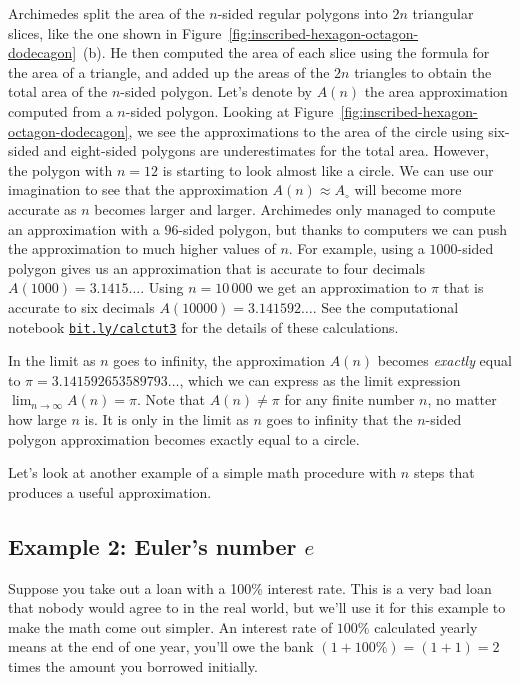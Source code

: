 		Archimedes split the area of the $n$-sided regular polygons into $2n$ triangular slices,
		like the one shown in Figure~\ref{fig:inscribed-hexagon-octagon-dodecagon}~(b).
		He then computed the area of each slice using the formula for the area of a triangle,
		and added up the areas of the $2n$ triangles
		to obtain the total area of the $n$-sided polygon.
		Let's denote by $A(n)$ the area approximation
		computed from a $n$-sided polygon.
		Looking at Figure~\ref{fig:inscribed-hexagon-octagon-dodecagon},
		we see the approximations to the area of the circle
		using six-sided and eight-sided polygons are underestimates for the total area.
		However,
		the polygon with $n=12$ is starting to look almost like a circle.
		We can use our imagination to see that the approximation $A(n) \approx A_{\circ}$
		will become more accurate as $n$ becomes larger and larger.
		Archimedes only managed to compute an approximation with a $96$-sided polygon,
		but thanks to computers we can push the approximation to much higher values of $n$.
		For example,
		using a $1000$-sided polygon gives us
		an approximation that is accurate to four decimals $A(1000) = 3.1415\ldots$.
		Using $n=10\,000$ we get an approximation to $\pi$
		that is accurate to six decimals $A(10000) = 3.141592\ldots$.
		See the computational notebook \href{https://bit.ly/calctut3}{\tt{bit.ly/calctut3}}
		for the details of these calculations.

		In the limit as $n$ goes to infinity,
		the approximation $A(n)$
		becomes \emph{exactly} equal to $\pi = 3.141592653589793\ldots$,
		which we can express as the limit expression $\lim_{n \to \infty} A(n) = \pi$.
		Note that $A(n) \neq \pi$ for any finite number $n$,
		no matter how large $n$ is.
		It is only in the limit as $n$ goes to infinity that the $n$-sided polygon approximation
		becomes exactly equal to a circle.

	\medskip
	\noindent
	Let's look at another example of a simple math procedure with $n$ steps
	that produces a useful approximation.


	\subsection{Example 2: Euler's number $e$}
	\label{introduction:eulers_number}

		Suppose you take out a loan with a 100\% interest rate.
		This is a very bad loan that nobody would agree to in the real world,
		but we'll use it for this example to make the math come out simpler.
		An interest rate of $100\%$ calculated yearly means at the end of one year,
		you'll owe the bank $(1+100\%) = (1+1)=2$ times the amount you borrowed initially.

